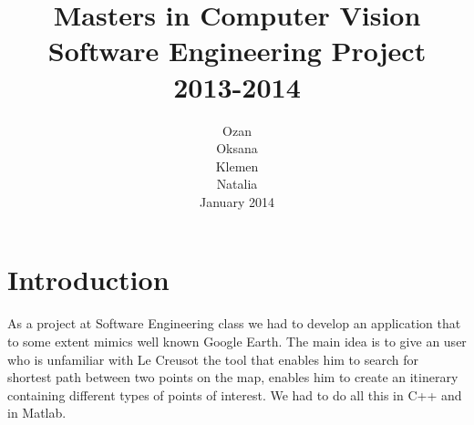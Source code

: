 \documentclass[reqno,openany,12pt]{amsbook}
\theoremstyle{definition}
\theoremstyle{remark}
\newcommand\ep{\epsilon}
\newcommand\R{\mathbb{R}}
\begin{document}
\title{Masters in Computer Vision\\Software Engineering Project\\2013-2014}
\author{Ozan\\Oksana\\Klemen\\Natalia\\
{\small
January 2014
}
}
\bigskip



%


\maketitle


 \setcounter{page}{0}


\tableofcontents


\chapter{Introduction}

As a project at Software Engineering class we had to develop an application that to some extent mimics well known Google Earth. The main idea is to give an user who is unfamiliar with Le Creusot the tool that enables him to search for shortest path between two points on the map, enables him to create an itinerary containing different types of points of interest. We had to do all this in C++ and in Matlab.
\end{document}
